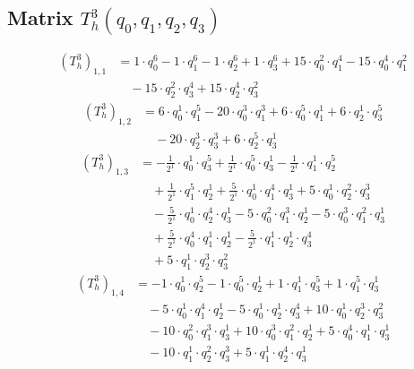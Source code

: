 \subsection{Matrix $T_{h}^3(q_0,q_1,q_2,q_3)$}
\begin{align*}(T_{h}^3)_{1,1}&=1\cdot q_0^{6}-1\cdot q_1^{6}-1\cdot q_2^{6}+1\cdot q_3^{6}+15\cdot q_0^{2}\cdot q_1^{4}-15\cdot q_0^{4}\cdot q_1^{2}\\
&\quad -15\cdot q_2^{2}\cdot q_3^{4}+15\cdot q_2^{4}\cdot q_3^{2}\end{align*}
\begin{align*}(T_{h}^3)_{1,2}&=6\cdot q_0^{1}\cdot q_1^{5}-20\cdot q_0^{3}\cdot q_1^{3}+6\cdot q_0^{5}\cdot q_1^{1}+6\cdot q_2^{1}\cdot q_3^{5}\\
&\quad -20\cdot q_2^{3}\cdot q_3^{3}+6\cdot q_2^{5}\cdot q_3^{1}\end{align*}
\begin{align*}(T_{h}^3)_{1,3}&=-\frac{1}{2^{1}}\cdot q_0^{1}\cdot q_3^{5}+\frac{1}{2^{1}}\cdot q_0^{5}\cdot q_3^{1}-\frac{1}{2^{1}}\cdot q_1^{1}\cdot q_2^{5}\\
&\quad +\frac{1}{2^{1}}\cdot q_1^{5}\cdot q_2^{1}+\frac{5}{2^{1}}\cdot q_0^{1}\cdot q_1^{4}\cdot q_3^{1}+5\cdot q_0^{1}\cdot q_2^{2}\cdot q_3^{3}\\
&\quad -\frac{5}{2^{1}}\cdot q_0^{1}\cdot q_2^{4}\cdot q_3^{1}-5\cdot q_0^{2}\cdot q_1^{3}\cdot q_2^{1}-5\cdot q_0^{3}\cdot q_1^{2}\cdot q_3^{1}\\
&\quad +\frac{5}{2^{1}}\cdot q_0^{4}\cdot q_1^{1}\cdot q_2^{1}-\frac{5}{2^{1}}\cdot q_1^{1}\cdot q_2^{1}\cdot q_3^{4}\\
&\quad +5\cdot q_1^{1}\cdot q_2^{3}\cdot q_3^{2}\end{align*}
\begin{align*}(T_{h}^3)_{1,4}&=-1\cdot q_0^{1}\cdot q_2^{5}-1\cdot q_0^{5}\cdot q_2^{1}+1\cdot q_1^{1}\cdot q_3^{5}+1\cdot q_1^{5}\cdot q_3^{1}\\
&\quad -5\cdot q_0^{1}\cdot q_1^{4}\cdot q_2^{1}-5\cdot q_0^{1}\cdot q_2^{1}\cdot q_3^{4}+10\cdot q_0^{1}\cdot q_2^{3}\cdot q_3^{2}\\
&\quad -10\cdot q_0^{2}\cdot q_1^{3}\cdot q_3^{1}+10\cdot q_0^{3}\cdot q_1^{2}\cdot q_2^{1}+5\cdot q_0^{4}\cdot q_1^{1}\cdot q_3^{1}\\
&\quad -10\cdot q_1^{1}\cdot q_2^{2}\cdot q_3^{3}+5\cdot q_1^{1}\cdot q_2^{4}\cdot q_3^{1}\end{align*}
